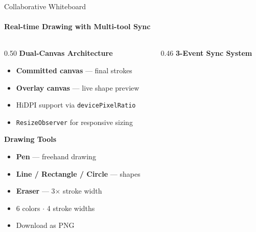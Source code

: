 \documentclass[aspectratio=169, 12pt]{beamer}
\begin{document}
\begin{frame}{Collaborative Whiteboard}
  \framesubtitle{Real-time Drawing with Multi-tool Sync}
  \begin{columns}[T]
    \begin{column}{0.50\textwidth}
      \vspace{0.3em}
      {\small\bfseries\color{MeetDark} Dual-Canvas Architecture}
      \vspace{0.4em}
      \begin{itemize}\setlength{\itemsep}{0.35em}
        \item \textbf{Committed canvas} --- final strokes
        \item \textbf{Overlay canvas} --- live shape preview
        \item HiDPI support via \texttt{devicePixelRatio}
        \item \texttt{ResizeObserver} for responsive sizing
      \end{itemize}

      \vspace{0.5em}
      {\small\bfseries\color{MeetDark} Drawing Tools}
      \vspace{0.3em}
      \begin{itemize}\setlength{\itemsep}{0.2em}
        \item {\color{MeetPrimary}\bfseries Pen} --- freehand drawing
        \item {\color{MeetAccent}\bfseries Line / Rectangle / Circle} --- shapes
        \item {\color{MeetRed}\bfseries Eraser} --- 3$\times$ stroke width
        \item 6 colors $\cdot$ 4 stroke widths
        \item Download as PNG
      \end{itemize}
    \end{column}

    \begin{column}{0.46\textwidth}
      \vspace{0.2em}
      {\small\bfseries\color{MeetDark} 3-Event Sync System}
      \vspace{0.3em}
\end{column}
\end{columns}
\end{frame}
\end{document}
